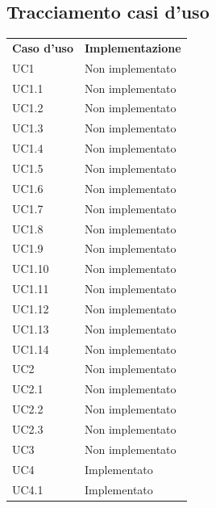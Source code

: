     \subsection{Tracciamento casi d'uso}
        \begin{longtable} {
            >{\centering}p{64.5mm} 
            >{}p{64.5mm}
            }
        \rowcolor{gray!50}
            \textbf{Caso d'uso} & \textbf{Implementazione} \TBstrut \\
            UC1 & Non implementato \TBstrut \\ [2mm]
            UC1.1 & Non implementato \TBstrut \\ [2mm]
            UC1.2 & Non implementato \TBstrut \\ [2mm]
            UC1.3 & Non implementato \TBstrut \\ [2mm]
            UC1.4 & Non implementato \TBstrut \\ [2mm]
            UC1.5 & Non implementato \TBstrut \\ [2mm]
            UC1.6 & Non implementato \TBstrut \\ [2mm]
            UC1.7 & Non implementato \TBstrut \\ [2mm]
            UC1.8 & Non implementato \TBstrut \\ [2mm]
            UC1.9 & Non implementato \TBstrut \\ [2mm]
            UC1.10 & Non implementato \TBstrut \\ [2mm]
            UC1.11 & Non implementato \TBstrut \\ [2mm]
            UC1.12 & Non implementato \TBstrut \\ [2mm]
            UC1.13 & Non implementato \TBstrut \\ [2mm]
            UC1.14 & Non implementato \TBstrut \\ [2mm]
            UC2 & Non implementato \TBstrut \\ [2mm]
            UC2.1 & Non implementato \TBstrut \\ [2mm]
            UC2.2 & Non implementato \TBstrut \\ [2mm]
            UC2.3 & Non implementato \TBstrut \\ [2mm]
            UC3 & Non implementato \TBstrut \\ [2mm]
            UC4 & Implementato \TBstrut \\ [2mm]
            UC4.1 & Implementato\TBstrut \\ [2mm]

\end{longtable}

